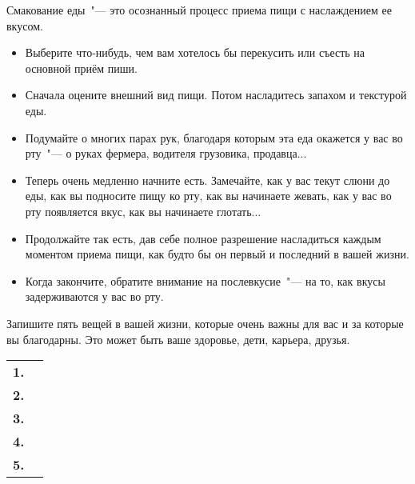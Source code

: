 \newpage
{} \label{IP:Savoring_Food}

Смакование еды~"--- это осознанный процесс приема пищи с наслаждением ее вкусом.

\begin{itemize}
	\item Выберите что-нибудь, чем вам хотелось бы перекусить или съесть на основной приём пиши.
	
	\item Сначала оцените внешний вид пищи. Потом насладитесь запахом и текстурой еды.
	
	\item Подумайте о многих парах рук, благодаря которым эта еда окажется у вас во рту~"--- о руках фермера, водителя грузовика, продавца...
	
	\item Теперь очень медленно начните есть.  Замечайте, как у вас текут слюни до еды, как вы подносите пищу ко рту, как вы начинаете жевать, как у вас во рту появляется вкус, как вы начинаете глотать...
	
	\item Продолжайте так есть, дав себе полное разрешение насладиться каждым моментом приема пищи, как будто бы он первый и последний в вашей жизни. 
	
	\item Когда закончите, обратите внимание на послевкусие~"--- на то, как вкусы задерживаются у вас во рту.
\end{itemize}


\newpage
{} \label{Ex:Gratitude_for_the_Big_and_Small_Things}


Запишите пять вещей в вашей жизни, которые очень важны для вас и за которые вы благодарны. Это может быть ваше здоровье, дети, карьера, друзья.

\vspace{1ex}

\noindent
\setlength{\extrarowheight}{3mm}
\begin{tabular*}{\textwidth}{rp{13.5cm}}
	\textbf{1.} & \\ \cline{2-2}
	\textbf{2.} & \\ \cline{2-2}
	\textbf{3.} & \\ \cline{2-2}
	\textbf{4.} & \\ \cline{2-2}
	\textbf{5.} & \\ \cline{2-2}
\end{tabular*}
\setlength{\extrarowheight}{0mm}

